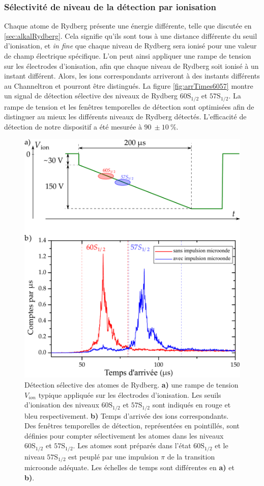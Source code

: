 \subsubsection*{Sélectivité de niveau de la détection par ionisation}
\noindent Chaque atome de Rydberg présente une énergie différente, telle que discutée en \ref{sec:alkalRydberg}.
Cela signifie qu'ils sont tous à une distance différente du seuil d'ionisation, et \textit{in fine} que chaque niveau de Rydberg sera ionisé pour une valeur de champ électrique spécifique.
L'on peut ainsi appliquer une rampe de tension sur les électrodes d'ionisation, afin que chaque niveau de Rydberg soit ionisé à un instant différent.
Alors, les ions correspondants arriveront à des instants différents au Channeltron et pourront être distingués.
La figure \eqref{fig:arrTimes6057} montre un signal de détection sélective des niveaux de Rydberg $\mathrm{60S_{1/2}}$ et $\mathrm{57S_{1/2}}$.
La rampe de tension et les fenêtres temporelles de détection sont optimisées afin de distinguer au mieux les différents niveaux de Rydberg détectés.
L'efficacité de détection de notre dispositif a été mesurée à $\SI{90}{} \pm \SI{10}{\percent}$.
%
\begin{figure}[h]
\centering
\includegraphics[width=.7\linewidth]{figures/arrTimes6057}
\caption[Détection sélective des niveaux $\mathrm{60S_{1/2}}$ et $\mathrm{57S_{1/2}}$]{
Détection sélective des atomes de Rydberg.
\textbf{a)} une rampe de tension $V_{ion}$ typique appliquée sur les électrodes d'ionisation.
Les seuils d'ionisation des niveaux $\mathrm{60S_{1/2}}$ et $\mathrm{57S_{1/2}}$ sont indiqués en rouge et bleu respectivement.
\textbf{b)} Temps d'arrivée des ions correspondants. Des fenêtres temporelles de détection, représentées en pointillés, sont définies pour compter sélectivement les atomes dans les niveaux $\mathrm{60S_{1/2}}$ et $\mathrm{57S_{1/2}}$.
Les atomes sont préparés dans l'état $\mathrm{60S_{1/2}}$ et le niveau $\mathrm{57S_{1/2}}$ est peuplé par une impulsion $\pi$ de la transition microonde adéquate.
Les échelles de temps sont différentes en \textbf{a)} et \textbf{b)}.
}
\label{fig:arrTimes6057}
\end{figure}
%


